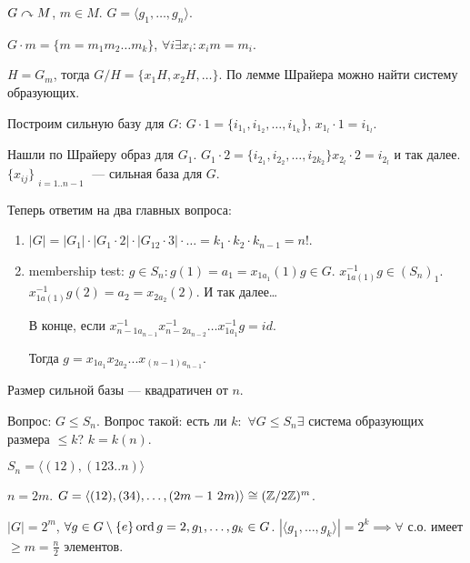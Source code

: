 \begin{exerc}
    $G \curvearrowright M$,  $m \in M$.  $G = \langle g_1, \ldots, g_n\rangle$.

    $G \cdot m = \{ m=m_1  m_2 \ldots m_k\}$, $\forall i \exists x_i\!: x_im = m_i$.

     $H = G_m$, тогда  $G / H = \{x_1H, x_2H, \ldots\}$. По лемме Шрайера можно найти систему образующих.

     Построим сильную базу для $G$:  $G \cdot 1 = \{i_{1_1}, i_{1_2}, \ldots, i_{1_k}\}$, $x_{1_l} \cdot 1 = i_{1_l}$.

     Нашли по Шрайеру образ для  $G_1$. $G_1 \cdot 2 = \{ i_{2_1}, i_{2_2}, \ldots, i_{2k_2}\} x_{2_l} \cdot 2 = i_{2_l}$ и так далее. $\{x_{ij}\}_{\substack{i=1..n-1}}$ --- сильная база для  $G$.
    
     Теперь ответим на два главных вопроса:
     \begin{enumerate}
         \item $|G| = |G_1| \cdot |G_1 \cdot 2| \cdot |G_{12} \cdot 3| \cdot \ldots = k_1 \cdot k_2 \cdot k_{n-1} = n!$.

         \item membership test: $g \in S_n\!: g(1) = a_1 = x_{1a_1}(1)g \in G$. $x_{1a(1)}^{-1} g \in (S_n)_1$. $x_{1a(1)}^{-1}g(2) = a_2 = x_{2a_2}(2)$. И так далее\dots

             В конце, если $x_{n-1 a_{n-1}}^{-1} x_{n-2 a_{n-2}}^{-1} \ldots x_{1 a_1}^{-1} g= id$.

             Тогда $g = x_{1 a_1}x_{2 a_2}...x_{(n-1) a_{n-1}}$. 
     \end{enumerate}
\end{exerc}

\begin{remark}
	Размер сильной базы --- квадратичен от $n$.
\end{remark}

Вопрос: $G \le S_n$. Вопрос такой: есть ли $k\!:$ $\forall G \le S_n \exists$ система образующих размера $\le k$? $k = k(n)$.
\begin{exerc}
    $S_n = \langle (12), (123..n) \rangle$
\end{exerc}
\begin{example}
	$n = 2m$.  $G = \langle (12), (34), \ldots, (2m-1\ 2m)\rangle \cong (\Z / 2 \Z)^m$.
	
	$|G| = 2^m$,  $\forall g \in G\setminus\{e\} \operatorname{ord} g = 2, g_1, \ldots, g_k \in G$. $|\langle g_1, \ldots, g_k \rangle| = 2^k \implies \forall$ с.о. имеет $\ge m = \frac{n}{2}$ элементов.
\end{example}
    
